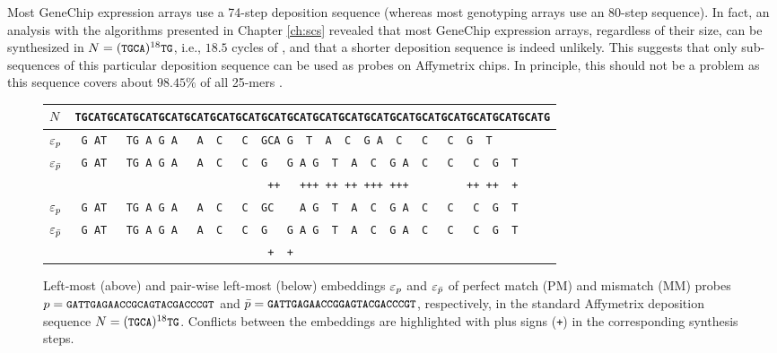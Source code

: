 Most GeneChip expression arrays use a 74-step deposition sequence (whereas most
genotyping arrays use an 80-step sequence). In fact, an analysis with the
algorithms presented in Chapter \ref{ch:scs} revealed that most GeneChip
expression arrays, regardless of their size, can be synthesized in
$N=({\text{\small{\tt{TGCA}}}})^{18}{\text{\small{\tt{TG}}}}$, i.e., $18.5$ cycles of , and that a
shorter deposition sequence is indeed unlikely. This suggests that only
sub-sequences of this particular deposition sequence can be used as probes on
Affymetrix chips. In principle, this should not be a problem as this sequence
covers about $98.45\%$ of all 25-mers \citep{Rahmann2006}.

\begin{figure}[t]\centering
\begin{tabular}{lc}
$N$              & \footnotesize{\tt{\verb|TGCATGCATGCATGCATGCATGCATGCATGCATGCATGCATGCATGCATGCATGCATGCATGCATGCATGCATG|}} \\
\hline
$\varepsilon_p$         & \footnotesize{\tt{\verb| G AT   TG A G A   A  C   C  GCA G  T  A  C  G A  C   C   C  G  T         |}} \\
$\varepsilon_{\bar{p}}$ & \footnotesize{\tt{\verb| G AT   TG A G A   A  C   C  G   G A G  T  A  C  G A  C   C   C  G  T     |}} \\
                 & \footnotesize{\tt{\verb|                              ++   +++ ++ ++ +++ +++         ++ ++  +     |}} \\
\hline
$\varepsilon_p$         & \footnotesize{\tt{\verb| G AT   TG A G A   A  C   C  GC    A G  T  A  C  G A  C   C   C  G  T     |}} \\
$\varepsilon_{\bar{p}}$ & \footnotesize{\tt{\verb| G AT   TG A G A   A  C   C  G   G A G  T  A  C  G A  C   C   C  G  T     |}} \\
                 & \footnotesize{\tt{\verb|                              +  +                                        |}} \\
\hline
\end{tabular}
\caption{\label{fig:pairwise_leftmost}%
  Left-most (above) and pair-wise left-most (below) embeddings $\varepsilon_p$ and
  $\varepsilon_{\bar{p}}$ of perfect match (PM) and mismatch (MM) probes
  $p={\text{\small{\tt{GATTGAGAACCGCAGTACGACCCGT}}}}$ and
  $\bar{p}={\text{\small{\tt{GATTGAGAACCGGAGTACGACCCGT}}}}$, respectively, in the standard
  Affymetrix deposition sequence $N=({\text{\small{\tt{TGCA}}}})^{18}{\text{\small{\tt{TG}}}}$. Conflicts
  between the embeddings are highlighted with plus signs (\small{\tt{+}})
  in the corresponding synthesis steps.}
\end{figure}


